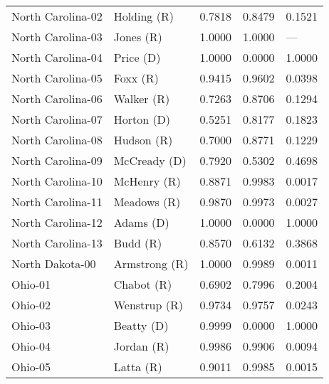 \begin{longtable}{llrll}
 North Carolina-02 &           {\color{Red} Holding (R)} &       0.7818 &        0.8479 &        0.1521 \\
 North Carolina-03 &             {\color{Red} Jones (R)} &       1.0000 &        1.0000 &           --- \\
 North Carolina-04 &            {\color{Blue} Price (D)} &       1.0000 &        0.0000 &        1.0000 \\
 North Carolina-05 &              {\color{Red} Foxx (R)} &       0.9415 &        0.9602 &        0.0398 \\
 North Carolina-06 &            {\color{Red} Walker (R)} &       0.7263 &        0.8706 &        0.1294 \\
 North Carolina-07 &           {\color{Blue} Horton (D)} &       0.5251 &        0.8177 &        0.1823 \\
 North Carolina-08 &            {\color{Red} Hudson (R)} &       0.7000 &        0.8771 &        0.1229 \\
 North Carolina-09 &         {\color{Blue} McCready (D)} &       0.7920 &        0.5302 &        0.4698 \\
 North Carolina-10 &           {\color{Red} McHenry (R)} &       0.8871 &        0.9983 &        0.0017 \\
 North Carolina-11 &           {\color{Red} Meadows (R)} &       0.9870 &        0.9973 &        0.0027 \\
 North Carolina-12 &            {\color{Blue} Adams (D)} &       1.0000 &        0.0000 &        1.0000 \\
 North Carolina-13 &              {\color{Red} Budd (R)} &       0.8570 &        0.6132 &        0.3868 \\
   North Dakota-00 &         {\color{Red} Armstrong (R)} &       1.0000 &        0.9989 &        0.0011 \\
           Ohio-01 &            {\color{Red} Chabot (R)} &       0.6902 &        0.7996 &        0.2004 \\
           Ohio-02 &          {\color{Red} Wenstrup (R)} &       0.9734 &        0.9757 &        0.0243 \\
           Ohio-03 &           {\color{Blue} Beatty (D)} &       0.9999 &        0.0000 &        1.0000 \\
           Ohio-04 &            {\color{Red} Jordan (R)} &       0.9986 &        0.9906 &        0.0094 \\
           Ohio-05 &             {\color{Red} Latta (R)} &       0.9011 &        0.9985 &        0.0015 \\

\end{longtable}
